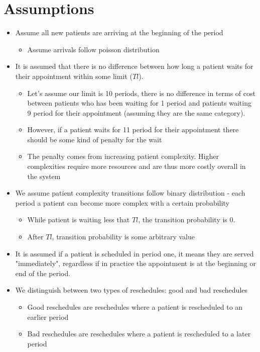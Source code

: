 \documentclass{article}
\begin{document}
\section{Assumptions} 
\begin{itemize}
	\item Assume all new patients are arriving at the beginning of the period 
	\begin{itemize}
		\item Assume arrivals follow poisson distribution
	\end{itemize}		
	
	\item It is assumed that there is no difference between how long a patient waits for their appointment within some limit ($Tl$). 
	\begin{itemize}
		\item Let's assume our limit is 10 periods, there is no difference in terms of cost between patients who has been waiting for 1 period and patients waiting 9 period for their appointment (assuming they are the same category).  
		\item However, if a patient waits for 11 period for their appointment there should be some kind of penalty for the wait
		\item The penalty comes from increasing patient complexity. Higher complexities require more resources and are thus more costly overall in the system
	\end{itemize}		
	
	\item We assume patient complexity transitions follow binary distribution - each period a patient can become more complex with a certain probability
		\begin{itemize}
			\item While patient is waiting less that $Tl$, the transition probability is 0.
			\item After $Tl$, transition probability is some arbitrary value
		\end{itemize}
	
	\item It is assumed if a patient is scheduled in period one, it means they are served "immediately", regardless if in practice the appointment is at the beginning or end of the period.
	\item We distinguish between two types of reschedules: good and bad reschedules
	\begin{itemize}
		\item Good reschedules are reschedules where a patient is rescheduled to an earlier period
		\item Bad reschedules are reschedules where a patient is rescheduled to a later period
	\end{itemize}


\end{itemize}
\end{document}
